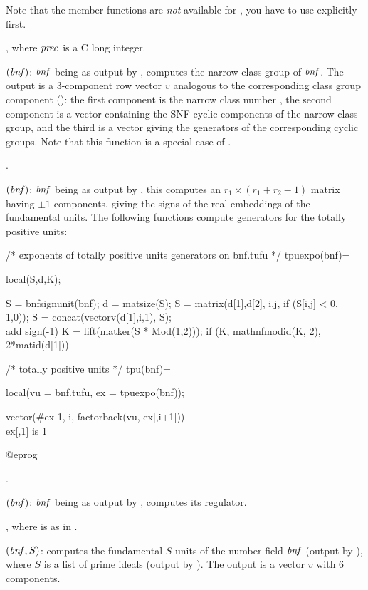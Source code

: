Note that the member functions are \emph{not} available for , you
have to use  explicitly first.

, where $\hbox{\it prec\/}$ is a
C long integer.

$(\hbox{\it bnf\/})$: $\hbox{\it bnf\/}$ being as output by
, computes the narrow class group of $\hbox{\it bnf\/}$. The output is
a 3-component row vector $v$ analogous to the corresponding class group
component  (): the first component
is the narrow class number , the second component is a vector
containing the SNF cyclic components  of
the narrow class group, and the third is a vector giving the generators of
the corresponding  cyclic groups. Note that this function is a
special case of .

.

$(\hbox{\it bnf\/})$: $\hbox{\it bnf\/}$ being as output by
, this computes an $r_1\times(r_1+r_2-1)$ matrix having $\pm1$
components, giving the signs of the real embeddings of the fundamental units.
The following functions compute generators for the totally positive units:

\bprog
/* exponents of totally positive units generators on bnf.tufu */
tpuexpo(bnf)=
{ local(S,d,K);

  S = bnfsignunit(bnf); d = matsize(S);
  S = matrix(d[1],d[2], i,j, if (S[i,j] < 0, 1,0));
  S = concat(vectorv(d[1],i,1), S);   \\ add sign(-1)
  K = lift(matker(S * Mod(1,2)));
  if (K, mathnfmodid(K, 2), 2*matid(d[1]))
}

/* totally positive units */
tpu(bnf)=
{ local(vu = bnf.tufu, ex = tpuexpo(bnf));

  vector(#ex-1, i, factorback(vu, ex[,i+1]))  \\ ex[,1] is 1
}
@eprog

.

$(\hbox{\it bnf\/})$: $\hbox{\it bnf\/}$ being as output by
, computes its regulator.

, where  is as in
.

$(\hbox{\it bnf\/},S)$: computes the fundamental $S$-units of the
number field $\hbox{\it bnf\/}$ (output by ), where $S$ is a list of
prime ideals (output by ). The output is a vector $v$ with
6 components.

